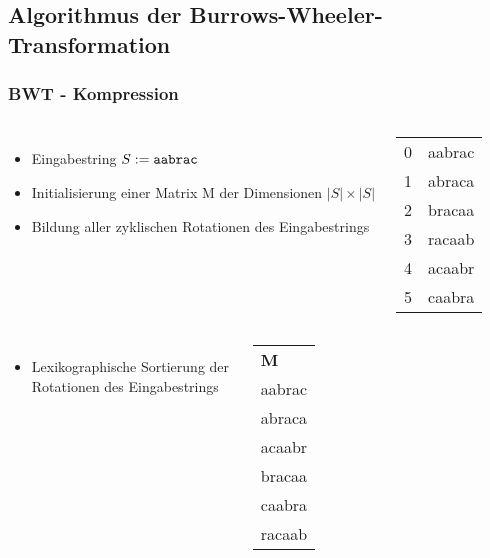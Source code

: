 \documentclass[14pt,xcolor=dvipsnames,pdftex]{beamer}
\begin{document}
\subsection{Algorithmus der Burrows-Wheeler-Transformation}
\begin{frame}[allowframebreaks]
 \frametitle{BWT - Kompression}
    \begin{columns}[c,onlytextwidth]
    \begin{itemize}
	\item Eingabestring $S := \text{\texttt{aabrac}}$	
	\item Initialisierung einer Matrix M der Dimensionen $|S| \times |S|$
	\item Bildung aller zyklischen Rotationen des Eingabestrings
    \end{itemize}
    \begin{center}
    \begin{tabular}{T|T}
    0 & aabrac \\
    1 & abraca \\
    2 & bracaa \\
    3 & racaab \\
    4 & acaabr \\
    5 & caabra \\
    \end{tabular}
    \end{center}
    \end{columns}
\framebreak
\begin{columns}[c,onlytextwidth]
 \begin{itemize}
  \item Lexikographische Sortierung der Rotationen des Eingabestrings
 \end{itemize}
    \begin{tabular}{T}
    \textbf{M} \\
    aabrac \\
    abraca \\
    acaabr \\
    bracaa \\
    caabra \\
    racaab \\
    \end{tabular}
\end{columns}
\framebreak
\begin{columns}[c,onlytextwidth]
 \begin{itemize}

\end{itemize}
\end{columns}
\end{frame}
\end{document}
